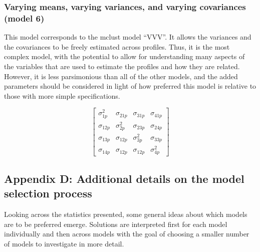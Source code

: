 \documentclass[]{msu-thesis}
\theoremstyle{definition}
\theoremstyle{definition}
\theoremstyle{definition}
\theoremstyle{remark}
\begin{document}
\subsubsection{Varying means, varying variances, and varying covariances
(model
6)}\label{varying-means-varying-variances-and-varying-covariances-model-6}

This model corresponds to the mclust model ``VVV''. It allows the
variances and the covariances to be freely estimated across profiles.
Thus, it is the most complex model, with the potential to allow for
understanding many aspects of the variables that are used to estimate
the profiles and how they are related. However, it is less parsimonious
than all of the other models, and the added parameters should be
considered in light of how preferred this model is relative to those
with more simple specifications.

\[
\left[ \begin{matrix} { \sigma  }_{ 1p }^{ 2 } & { \sigma  }_{ 21p } & { \sigma  }_{ 31p } & { \sigma  }_{ 41p } \\ { \sigma  }_{ 12p } & { \sigma  }_{ 2p }^{ 2 } & { \sigma  }_{ 23p } & { \sigma  }_{ 24p } \\ { \sigma  }_{ 13p } & { \sigma  }_{ 12p } & { \sigma  }_{ 3p }^{ 2 } & { \sigma  }_{ 33p } \\ { \sigma  }_{ 14p } & { \sigma  }_{ 12p } & { \sigma  }_{ 12p } & { \sigma  }_{ 4p }^{ 2 } \end{matrix} \right] 
\]

\subsection{Appendix D: Additional details on the model selection
process}\label{appendix-d-additional-details-on-the-model-selection-process}

Looking across the statistics presented, some general ideas about which
models are to be preferred emerge. Solutions are interpreted first for
each model individually and then across models with the goal of choosing
a smaller number of models to investigate in more detail.
\end{document}
